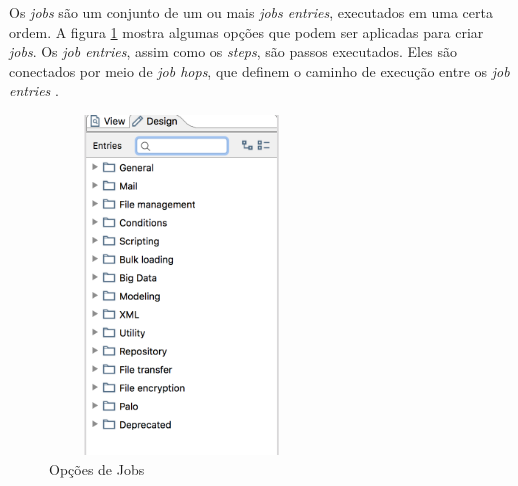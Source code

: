 Os \textit{jobs} são um conjunto de um ou mais \textit{jobs entries}, executados em uma certa ordem. A figura \ref{jobsOptions} mostra algumas opções que podem ser aplicadas para criar \textit{jobs}. Os\textit{ job entries}, assim como os \textit{steps}, são passos executados. Eles são conectados por meio de \textit{job hops}, que definem o caminho de execução entre os \textit{job entries} \citep{kettle}.
\begin{figure}[H]
\centering
\includegraphics[width=7cm, height=9cm]{imagens/opcoes_de_jobs.png}
\caption{Opções de Jobs}
\label{jobsOptions}
\end{figure}
